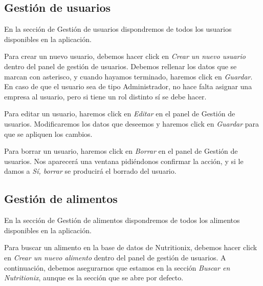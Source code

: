 
\subsection{Gestión de usuarios}

En la sección de Gestión de usuarios dispondremos de todos los usuarios disponibles en la aplicación.


Para crear un nuevo usuario, debemos hacer click en \textit{Crear un nuevo usuario} dentro del panel de gestión de usuarios. Debemos rellenar los datos que se marcan con asterisco, y cuando hayamos terminado, haremos click en \textit{Guardar}. En caso de que el usuario sea de tipo Administrador, no hace falta asignar una empresa al usuario, pero si tiene un rol distinto sí se debe hacer.


Para editar un usuario, haremos click en \textit{Editar} en el panel de Gestión de usuarios. Modificaremos los datos que deseemos y haremos click en \textit{Guardar} para que se apliquen los cambios.


Para borrar un usuario, haremos click en \textit{Borrar} en el panel de Gestión de usuarios. Nos aparecerá una ventana pidiéndonos confirmar la acción, y si le damos a \textit{Sí, borrar} se producirá el borrado del usuario.


\subsection{Gestión de alimentos}

En la sección de Gestión de alimentos dispondremos de todos los alimentos disponibles en la aplicación.


Para buscar un alimento en la base de datos de Nutritionix, debemos hacer click en \textit{Crear un nuevo alimento} dentro del panel de gestión de usuarios. A continuación, debemos asegurarnos que estamos en la sección \textit{Buscar en Nutritionix}, aunque es la sección que se abre por defecto. 

